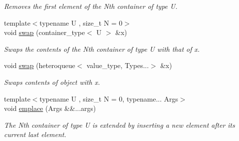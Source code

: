 \begin{DoxyCompactItemize}
\begin{DoxyCompactList}\small\item\em Removes the first element of the Nth container of type U. \end{DoxyCompactList}\item 
\hypertarget{classheterogeneous_1_1heteroqueue_3_01_t_00_01_types_8_8_8_4_a66b219d5be68002dce3d3eb0a56f1935}{}{\footnotesize template$<$typename U , size\+\_\+t N = 0$>$ }\\void \hyperlink{classheterogeneous_1_1heteroqueue_3_01_t_00_01_types_8_8_8_4_a66b219d5be68002dce3d3eb0a56f1935}{swap} (container\+\_\+type$<$ U $>$ \&x)\label{classheterogeneous_1_1heteroqueue_3_01_t_00_01_types_8_8_8_4_a66b219d5be68002dce3d3eb0a56f1935}

\begin{DoxyCompactList}\small\item\em Swaps the contents of the Nth container of type U with that of x. \end{DoxyCompactList}\item 
\hypertarget{classheterogeneous_1_1heteroqueue_3_01_t_00_01_types_8_8_8_4_a3b217e5ad785fbe272412eb801a6b179}{}void \hyperlink{classheterogeneous_1_1heteroqueue_3_01_t_00_01_types_8_8_8_4_a3b217e5ad785fbe272412eb801a6b179}{swap} (heteroqueue$<$ value\+\_\+type, Types...$>$ \&x)\label{classheterogeneous_1_1heteroqueue_3_01_t_00_01_types_8_8_8_4_a3b217e5ad785fbe272412eb801a6b179}

\begin{DoxyCompactList}\small\item\em Swaps contents of object with x. \end{DoxyCompactList}\item 
\hypertarget{classheterogeneous_1_1heteroqueue_3_01_t_00_01_types_8_8_8_4_a30c8689b37315b961b9f7e1586e4cdaf}{}{\footnotesize template$<$typename U , size\+\_\+t N = 0, typename... Args$>$ }\\void \hyperlink{classheterogeneous_1_1heteroqueue_3_01_t_00_01_types_8_8_8_4_a30c8689b37315b961b9f7e1586e4cdaf}{emplace} (Args \&\&...args)\label{classheterogeneous_1_1heteroqueue_3_01_t_00_01_types_8_8_8_4_a30c8689b37315b961b9f7e1586e4cdaf}

\begin{DoxyCompactList}\small\item\em The Nth container of type U is extended by inserting a new element after its current last element. \end{DoxyCompactList}\end{DoxyCompactItemize}
